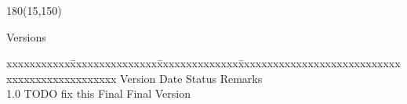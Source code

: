 
\begin{textblock}{180}(15,150)
\color{black}
\begin{huge}
Versions
\end{huge}
\vspace{10mm}

\fontsize{10pt}{18pt}\selectfont
\begin{tabbing}
xxxxxxxxxxx\=xxxxxxxxxxxxxxx\=xxxxxxxxxxxxxx\=xxxxxxxxxxxxxxxxxxxxxxxxxxxxxxxxxxxxxxxxxxxxxxx \kill
Version	\> Date	\> Status			\> Remarks		\\
1.0	\> TODO fix this	\> Final		\> Final Version 	\\
\end{tabbing}

\end{textblock}
